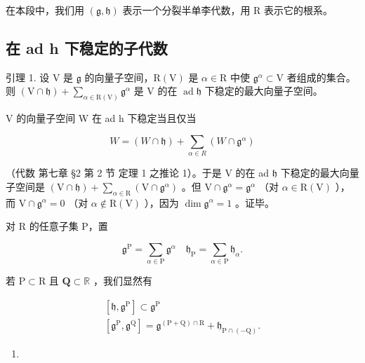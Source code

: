 在本段中，我们用 \((\mathfrak{g},\mathfrak{h})\) 表示一个分裂半单李代数，用 R 表示它的根系。

\subsection{在 ad h 下稳定的子代数}

引理 1. 设 \(\mathrm{V}\) 是 \(\mathfrak{g}\) 的向量子空间，\(\mathrm{R(V)}\) 是 \(\alpha \in \mathrm{R}\) 中使 \(\mathfrak{g}^{\alpha} \subset \mathrm{V}\) 者组成的集合。则 \((\mathrm{V} \cap \mathfrak{h}) + \sum_{\alpha \in \mathrm{R(V)}} \mathfrak{g}^{\alpha}\) 是 \(\mathrm{V}\) 的在 \(\operatorname{ad} \mathfrak{h}\) 下稳定的最大向量子空间。

V 的向量子空间 W 在 ad h 下稳定当且仅当

\[
W = (W \cap \mathfrak {h}) + \sum_ {\alpha \in R} (W \cap \mathfrak {g} ^ {\alpha})
\]

（代数 第七章 §2 第 2 节 定理 1 之推论 1）。于是 V 的在 ad \(\mathfrak{h}\) 下稳定的最大向量子空间是 \((\mathrm{V} \cap \mathfrak{h}) + \sum_{\alpha \in \mathrm{R}} (\mathrm{V} \cap \mathfrak{g}^{\alpha})\) 。但 \(\mathrm{V} \cap \mathfrak{g}^{\alpha} = \mathfrak{g}^{\alpha}\) （对 \(\alpha \in \mathrm{R}(\mathrm{V})\) ），而 \(\mathrm{V} \cap \mathfrak{g}^{\alpha} = 0\) （对 \(\alpha \notin \mathrm{R}(\mathrm{V})\) ），因为 \(\dim \mathfrak{g}^{\alpha} = 1\) 。证毕。

对 R 的任意子集 P，置

\[
\mathfrak {g} ^ {\mathrm{P}} = \sum_ {\alpha \in \mathrm{P}} \mathfrak {g} ^ {\alpha} \quad \mathfrak {h} _ {\mathrm{P}} = \sum_ {\alpha \in \mathrm{P}} \mathfrak {h} _ {\alpha}.
\]

若 \(\mathrm{P}\subset \mathrm{R}\) 且 \(\mathbf{Q}\subset \mathbb{R}\) ，我们显然有

\[
\begin{array}{c} {[ \mathfrak {h}, \mathfrak {g} ^ {\mathrm{P}} ] \subset \mathfrak {g} ^ {\mathrm{P}}} \\ {[ \mathfrak {g} ^ {\mathrm{P}}, \mathfrak {g} ^ {\mathrm{Q}} ] = \mathfrak {g} ^ {(\mathrm{P+Q}) \cap \mathrm{R}} + \mathfrak {h} _ {\mathrm{P} \cap (- \mathrm{Q})}.} \end{array}\tag{1}
\]

\begin{enumerate}
\def\labelenumi{(\arabic{enumi})}
\setcounter{enumi}{1}
\tightlist
\item
\end{enumerate}


